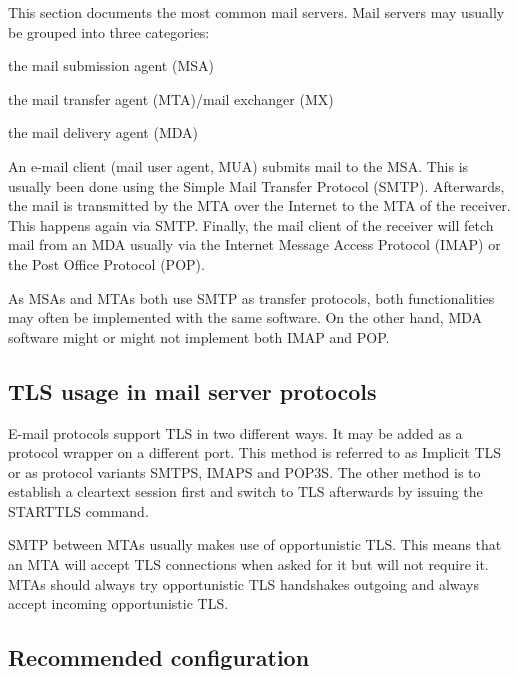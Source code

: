 \gdef\currentsectionname{MailServers}
This section documents the most common mail servers. Mail servers may usually be
grouped into three categories:
\begin{itemize*}
  \item the mail submission agent (MSA)
  \item the mail transfer agent (MTA)/mail exchanger (MX)
  \item the mail delivery agent (MDA)
\end{itemize*}

An e-mail client (mail user agent, MUA) submits mail to the MSA. This is usually
been done using the Simple Mail Transfer Protocol (SMTP). Afterwards, the mail
is transmitted by the MTA over the Internet to the MTA of the receiver. This
happens again via SMTP. Finally, the mail client of the receiver will fetch mail
from an MDA usually via the Internet Message Access Protocol (IMAP) or the Post
Office Protocol (POP).

As MSAs and MTAs both use SMTP as transfer protocols, both functionalities may
often be implemented with the same software. On the other hand, MDA software
might or might not implement both IMAP and POP.

\subsection{TLS usage in mail server protocols}

E-mail protocols support TLS in two different ways. It may be added as a
protocol wrapper on a different port. This method is referred to as Implicit TLS
or as protocol variants SMTPS, IMAPS and POP3S. The other method is to establish
a cleartext session first and switch to TLS afterwards by issuing the STARTTLS
command.

SMTP between MTAs usually makes use of opportunistic TLS. This means that an
MTA will accept TLS connections when asked for it but will not require it.
MTAs should always try opportunistic TLS handshakes outgoing and always accept
incoming opportunistic TLS.

\subsection{Recommended configuration}

